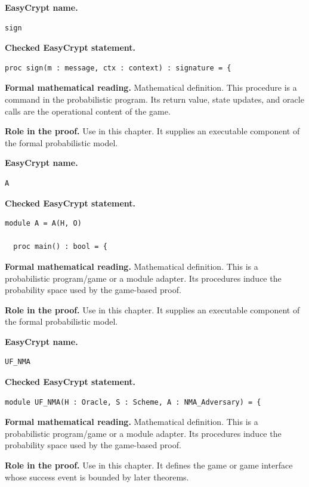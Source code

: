 \begin{formaldefinition}
\noindent\textbf{EasyCrypt name.}
\begin{lstlisting}[language=EasyCrypt,basicstyle=\ttfamily\scriptsize]
sign
\end{lstlisting}
\noindent\textbf{Checked EasyCrypt statement.}
\begin{lstlisting}[language=EasyCrypt,basicstyle=\ttfamily\scriptsize]
proc sign(m : message, ctx : context) : signature = {
\end{lstlisting}
\noindent\textbf{Formal mathematical reading.}
Mathematical definition. This procedure is a command in the probabilistic program.  Its return value, state updates, and oracle calls are the operational content of the game.

\noindent\textbf{Role in the proof.}
Use in this chapter. It supplies an executable component of the formal probabilistic model.

\end{formaldefinition}

\begin{formaldefinition}
\noindent\textbf{EasyCrypt name.}
\begin{lstlisting}[language=EasyCrypt,basicstyle=\ttfamily\scriptsize]
A
\end{lstlisting}
\noindent\textbf{Checked EasyCrypt statement.}
\begin{lstlisting}[language=EasyCrypt,basicstyle=\ttfamily\scriptsize]
module A = A(H, O)

  proc main() : bool = {
\end{lstlisting}
\noindent\textbf{Formal mathematical reading.}
Mathematical definition. This is a probabilistic program/game or a module adapter.  Its procedures induce the probability space used by the game-based proof.

\noindent\textbf{Role in the proof.}
Use in this chapter. It supplies an executable component of the formal probabilistic model.

\end{formaldefinition}

\begin{formaldefinition}
\noindent\textbf{EasyCrypt name.}
\begin{lstlisting}[language=EasyCrypt,basicstyle=\ttfamily\scriptsize]
UF_NMA
\end{lstlisting}
\noindent\textbf{Checked EasyCrypt statement.}
\begin{lstlisting}[language=EasyCrypt,basicstyle=\ttfamily\scriptsize]
module UF_NMA(H : Oracle, S : Scheme, A : NMA_Adversary) = {
\end{lstlisting}
\noindent\textbf{Formal mathematical reading.}
Mathematical definition. This is a probabilistic program/game or a module adapter.  Its procedures induce the probability space used by the game-based proof.

\noindent\textbf{Role in the proof.}
Use in this chapter. It defines the game or game interface whose success event is bounded by later theorems.

\end{formaldefinition}

